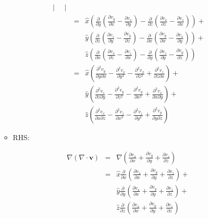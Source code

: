 \documentclass[12pt,a4paper,twoside]{article}
\begin{document}
\begin{enumerate}
\begin{itemize}
\begin{eqnarray*}
\begin{vmatrix}
				\end{vmatrix}\\
				&=& \hat{x}\left(\frac{\partial}{\partial y}\left(\frac{\partial v_y}{\partial x}-\frac{\partial v_x}{\partial y}\right)-\frac{\partial}{\partial z}\left(\frac{\partial v_x}{\partial z}-\frac{\partial v_z}{\partial x}\right)\right) +\\
				& & \hat{y}\left(\frac{\partial}{\partial z}\left(\frac{\partial v_z}{\partial y}-\frac{\partial v_y}{\partial z}\right)-\frac{\partial}{\partial x}\left(\frac{\partial v_y}{\partial x}-\frac{\partial v_x}{\partial y}\right)\right) +\\
				& & \hat{z}\left(\frac{\partial}{\partial x}\left(\frac{\partial v_x}{\partial z}-\frac{\partial v_z}{\partial x}\right)-\frac{\partial }{\partial y}\left(
				\frac{\partial v_z}{\partial y}-\frac{\partial v_y}{\partial z}\right)\right)\\
				&=& \hat{x}\left(\frac{\partial^2 v_y}{\partial y\partial x}-\frac{\partial^2 v_x}{\partial y^2}-\frac{\partial^2 v_x}{\partial z^2}+\frac{\partial^2 v_z}{\partial z\partial x}\right) + \\
				& & \hat{y}\left(\frac{\partial^2v_z}{\partial z\partial y}-\frac{\partial^2v_y}{\partial z^2}-\frac{\partial^2v_y}{\partial x^2}+\frac{\partial^2v_x}{\partial x\partial y}\right) + \\
				& & \hat{z}\left(\frac{\partial^2 v_x}{\partial x\partial z}-\frac{\partial^2v_z}{\partial x^2}-\frac{\partial^2v_z}{\partial y^2}+\frac{\partial^2 v_y}{\partial y\partial z}\right)
			\end{eqnarray*}
			\item RHS:
			
			\begin{eqnarray*}
				\nabla (\nabla \cdot \textbf{v}) &=& \nabla (\frac{\partial v_x}{\partial x}+\frac{\partial v_y}{\partial y}+\frac{\partial v_z}{\partial z}) \\
				&=& \hat{x}\frac{\partial}{\partial x}\left(\frac{\partial v_x}{\partial x}+\frac{\partial v_y}{\partial y}+\frac{\partial v_z}{\partial z}\right)+\\
				& &\hat{y}\frac{\partial}{\partial y}\left(\frac{\partial v_x}{\partial x}+\frac{\partial v_y}{\partial y}+\frac{\partial v_z}{\partial z}\right)+\\
				& &\hat{z}\frac{\partial}{\partial z}\left(\frac{\partial v_x}{\partial x}+\frac{\partial v_y}{\partial y}+\frac{\partial v_z}{\partial z}\right)
			\end{eqnarray*}
			

\end{itemize}
\end{enumerate}
\end{document}
